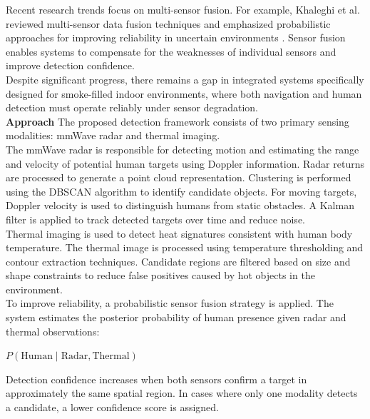 \documentclass[conference]{IEEEtran}
\begin{document}
Recent research trends focus on multi-sensor fusion. For example, Khaleghi et al. reviewed multi-sensor data fusion techniques and emphasized probabilistic approaches for improving reliability in uncertain environments \cite{sensor_fusion}. Sensor fusion enables systems to compensate for the weaknesses of individual sensors and improve detection confidence.\\

Despite significant progress, there remains a gap in integrated systems specifically designed for smoke-filled indoor environments, where both navigation and human detection must operate reliably under sensor degradation.\\

\textbf{Approach}
\newline
The proposed detection framework consists of two primary sensing modalities: mmWave radar and thermal imaging.\\

The mmWave radar is responsible for detecting motion and estimating the range and velocity of potential human targets using Doppler information. Radar returns are processed to generate a point cloud representation. Clustering is performed using the DBSCAN algorithm to identify candidate objects. For moving targets, Doppler velocity is used to distinguish humans from static obstacles. A Kalman filter is applied to track detected targets over time and reduce noise.\\

Thermal imaging is used to detect heat signatures consistent with human body temperature. The thermal image is processed using temperature thresholding and contour extraction techniques. Candidate regions are filtered based on size and shape constraints to reduce false positives caused by hot objects in the environment.\\

To improve reliability, a probabilistic sensor fusion strategy is applied. The system estimates the posterior probability of human presence given radar and thermal observations:

\begin{center}
    $P(\text{Human} \mid \text{Radar}, \text{Thermal})$
\end{center}

Detection confidence increases when both sensors confirm a target in approximately the same spatial region. In cases where only one modality detects a candidate, a lower confidence score is assigned.\\
\end{document}
